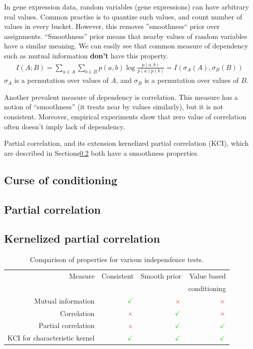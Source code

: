 \documentclass{article} %
\begin{document}
In gene expression data, random variables (gene expressions) can 
have arbitrary real values. Common practise is to quantize such values,
and count number of values in every bucket. However, this removes 
''smoothness`` prior over assignments. ``Smoothness'' prior means that
nearby values of random variables have a similar meaning. We can easily see
that common measure of dependency such as mutual information {\bf don't} have 
this property. 
\begin{align*}
  I(A;B)=\sum_{a \in A}\sum_{b \in B} p(a, b)\log{\frac{p(a, b)}{p(a)p(b)}}=I(\sigma_A(A), \sigma_B(B))
\end{align*}
$\sigma_A$ is a permutation over values of $A$, and $\sigma_B$ is
a permutation over values of $B$.



Another prevalent measure of dependency is correlation. This measure
has a notion of ``smoothness'' (it treats near by values similarly), but
it is not consistent. Moreover, empirical experiments show that zero value
of correlation often doesn't imply lack of dependency. 

Partial correlation, and its extension kernelized partial correlation (KCI), which are described 
in Sections\ref{sec:corr} both have a smoothness properties.


\subsection{Curse of conditioning}\label{sec:curse}

\subsection{Partial correlation}\label{sec:corr}

\subsection{Kernelized partial correlation}


\begin{table}[t]
\centering
\tiny
\begin{tabular}{rrrr}
\hline
Measure & Consistent & Smooth prior& Value based\\
& & & conditioning\\
\hline
Mutual information & $\color{LimeGreen} \checkmark $ & $\color{Maroon}\times$ & $\color{Maroon}\times$ \\
Correlation & $\color{Maroon}\times$  & $\color{LimeGreen} \checkmark $ & $\color{Maroon}\times$ \\
Partial correlation & $\color{Maroon}\times$  & $\color{LimeGreen} \checkmark $ & $\color{LimeGreen}\checkmark$ \\
KCI for characteristic kernel & $\color{LimeGreen}\checkmark$  & $\color{LimeGreen} \checkmark $ & $\color{LimeGreen}\checkmark$ \\
\hline
\end{tabular}
\caption{Comparison of properties for various independence tests.}
\label{eval}
\end{table}
\end{document}
